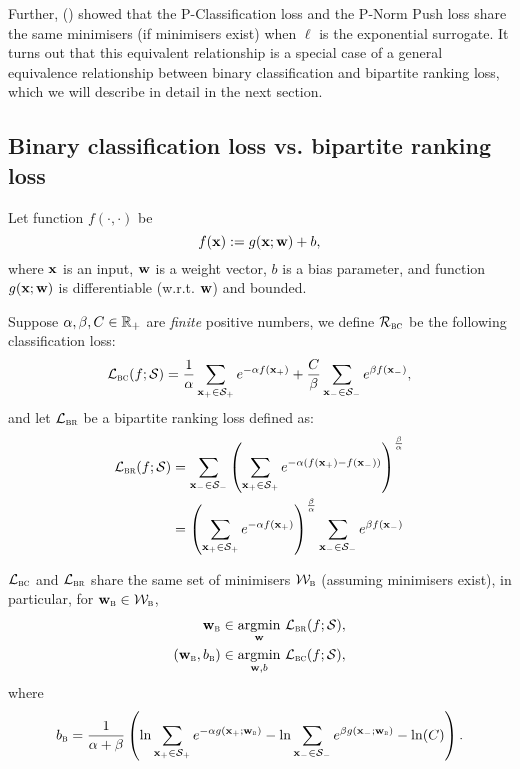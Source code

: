 Further, (\cite{ertekin2011equivalence}) showed that the P-Classification loss and the P-Norm Push loss share the same minimisers
(if minimisers exist) when $\ell$ is the exponential surrogate.
It turns out that this equivalent relationship is a special case of a general equivalence relationship 
between binary classification and bipartite ranking loss, which we will describe in detail in the next section.



\subsection{Binary classification loss vs. bipartite ranking loss}

Let function $f(\cdot, \cdot)$ be
$$
f(\mathbf{x}) := g(\mathbf{x}; \mathbf{w}) + b,
$$
where $\mathbf{x}$ is an input, $\mathbf{w}$ is a weight vector, $b$ is a bias parameter, 
and function $g(\mathbf{x}; \mathbf{w})$ is differentiable (w.r.t. $\mathbf{w}$) and bounded.

Suppose $\alpha, \beta, C \in \mathbb{R}_+$ are \emph{finite} positive numbers, we define 
$\mathcal{R}_\textsc{bc}$ be the following classification loss:
\begin{equation*}
\mathcal{L}_\textsc{bc}(f; \mathcal{S})
= \displaystyle 
  \frac{1}{\alpha} \sum_{\mathbf{x}_+ \in \mathcal{S}_+} e^{-\alpha f(\mathbf{x}_+)} +
  \frac{C}{\beta}  \sum_{\mathbf{x}_- \in \mathcal{S}_-} e^{ \beta  f(\mathbf{x}_-)},
\end{equation*}
and let
$\mathcal{L}_\textsc{br}$ be a bipartite ranking loss defined as:
\begin{equation*}
\begin{aligned}
\mathcal{L}_\textsc{br}(f; \mathcal{S})
&= \displaystyle 
   \sum_{\mathbf{x}_- \in \mathcal{S}_-} \left( \sum_{\mathbf{x}_+ \in \mathcal{S}_+} e^{-\alpha (f(\mathbf{x}_+) - f(\mathbf{x}_-))} \right)^\frac{\beta}{\alpha} \\
&= \left( \sum_{\mathbf{x}_+ \in \mathcal{S}_+} e^{-\alpha f(\mathbf{x}_+)} \right)^\frac{\beta}{\alpha}
   \sum_{\mathbf{x}_- \in \mathcal{S}_-} e^{ \beta f(\mathbf{x}_-)}
\end{aligned}
\end{equation*}


\begin{theorem}
\label{th:bc=br}
$\mathcal{L}_\textsc{bc}$ and $\mathcal{L}_\textsc{br}$ share the same set of minimisers $\mathcal{W}_\textsc{b}$
(assuming minimisers exist), in particular, for $\mathbf{w}_\textsc{b} \in \mathcal{W}_\textsc{b}$,
\begin{equation*}
\begin{aligned}
                \mathbf{w}_\textsc{b} & \in \operatorname*{argmin}_{\mathbf{w}}     \, \mathcal{L}_\textsc{br}(f; \mathcal{S}), \\
(\mathbf{w}_\textsc{b}, b_\textsc{b}) & \in \operatorname*{argmin}_{\mathbf{w},b} \, \mathcal{L}_\textsc{bc}(f; \mathcal{S}),
\end{aligned}
\end{equation*}
where
$$
\displaystyle
b_\textsc{b} 
= \frac{1}{\alpha + \beta} \left( 
  \ln \sum_{\mathbf{x}_+ \in \mathcal{S}_+} e^{-\alpha g(\mathbf{x}_+; \mathbf{w}_\textsc{b})} -
  \ln \sum_{\mathbf{x}_- \in \mathcal{S}_-} e^{  \beta g(\mathbf{x}_-; \mathbf{w}_\textsc{b})} - \ln(C) \right).
$$
\end{theorem}

